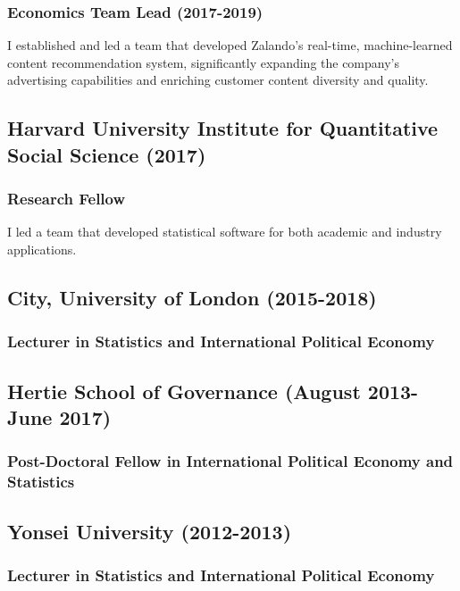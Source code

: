 \documentclass[a4paper]{article}
\begin{document}
\subsubsection*{Economics Team Lead (2017-2019)}

I established and led a team that developed Zalando’s real-time, machine-learned content recommendation system, significantly expanding the company’s advertising capabilities and enriching customer content diversity and quality.

\subsection*{Harvard University Institute for Quantitative Social Science (2017)}

\subsubsection*{Research Fellow}

I led a team that developed statistical software for both academic and industry applications.

\subsection*{City, University of London (2015-2018)}

\subsubsection*{Lecturer in Statistics and International Political Economy}

\subsection*{Hertie School of Governance (August 2013-June 2017)}

\subsubsection*{Post-Doctoral Fellow in International Political Economy and Statistics}

\subsection*{Yonsei University (2012-2013)}

\subsubsection*{Lecturer in Statistics and International Political Economy}
\end{document}
